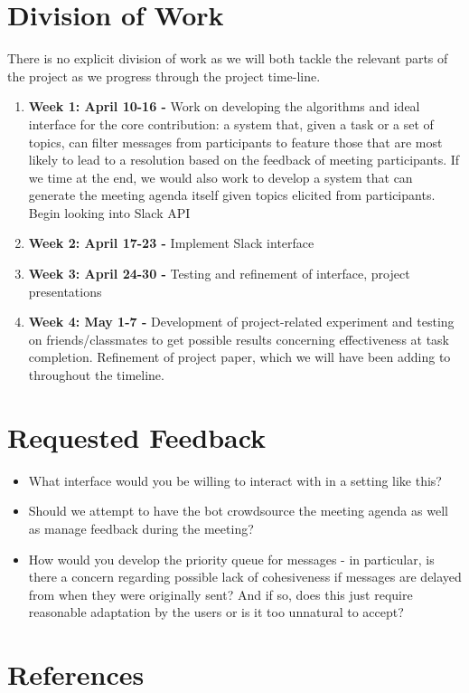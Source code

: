 \documentclass[final,authoryear,11pt,times]{elsarticle}
\begin{document}
\section{Division of Work}
	\label{sec:requestedfeedback}
	There is no explicit division of work as we will both tackle the relevant parts of the project as we progress through the project time-line. 
	\begin{enumerate}
		\item{}\textbf{Week 1: April 10-16 -} Work on developing the algorithms and ideal interface for the core contribution: a system that, given a task or a set of topics, can filter messages from participants to feature those that are most likely to lead to a resolution based on the feedback of meeting participants. If we time at the end, we would also work to develop a system that can generate the meeting agenda itself given topics elicited from participants. Begin looking into Slack API	
		\item{}\textbf{Week 2: April 17-23 -} Implement Slack interface 
		\item{}\textbf{Week 3: April 24-30 -} Testing and refinement of interface, project presentations
		\item{}\textbf{Week 4: May 1-7 -} Development of project-related experiment and testing on friends/classmates to get possible results concerning effectiveness at task completion. Refinement of project paper, which we will have been adding to throughout the timeline.	
	\end{enumerate}

\section{Requested Feedback}
	\label{sec:requestedfeedback}
	\begin{itemize}
		\item{}What interface would you be willing to interact with in a setting like this? 
		\item{}Should we attempt to have the bot crowdsource the meeting agenda as well as manage feedback during the meeting? 
		\item{}How would you develop the priority queue for messages - in particular, is there a concern regarding possible lack of cohesiveness if messages are delayed from when they were originally sent? And if so, does this just require reasonable adaptation by the users or is it too unnatural to accept?
	\end{itemize}

\section{References}



\end{document}
